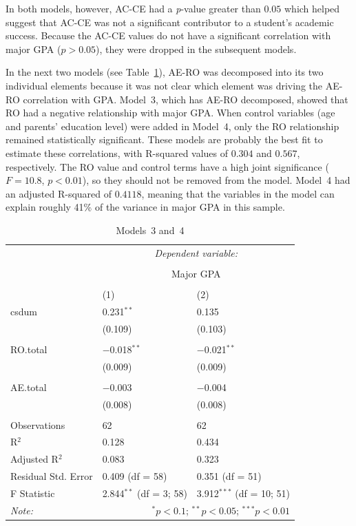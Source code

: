 In both models, however, AC-CE had a \textit{p}-value greater than $0.05$ which helped suggest that AC-CE was not a significant contributor to a student's academic success. Because the AC-CE values do not have a significant correlation with major GPA ($p>0.05$), they were dropped in the subsequent models.

In the next two models (see Table~\ref{tab:models34}), AE-RO was decomposed into its two individual elements because it was not clear which element was driving the AE-RO correlation with GPA. Model~3, which has AE-RO decomposed, showed that RO had a negative relationship with major GPA. When control variables (age and parents' education level) were added in Model~4, only the RO relationship remained statistically significant. These models are probably the best fit to estimate these correlations, with R-squared values of $0.304$ and $0.567$, respectively. The RO value and control terms have a high joint significance ($F=10.8$, $p<0.01$), so they should not be removed from the model. Model~4 had an adjusted R-squared of $0.4118$, meaning that the variables in the model can explain roughly 41\% of the variance in major GPA in this sample.

\begin{table}[!htbp] \centering
  \caption{Models~3 and~4}
  \label{tab:models34}
  \begin{tabular}{@{\extracolsep{5pt}}lll}
    \toprule
     & \multicolumn{2}{c}{\textit{Dependent variable:}} \\
    \cline{2-3}
    \\[-1.8ex] & \multicolumn{2}{c}{Major GPA} \\
    \\[-1.8ex] & (1) & (2)\\
    \midrule
    csdum & 0.231$^{**}$ & 0.135 \\
      & (0.109) & (0.103) \\
      & & \\
    RO.total & $-$0.018$^{**}$ & $-$0.021$^{**}$ \\
      & (0.009) & (0.009) \\
      & & \\
    AE.total & $-$0.003 & $-$0.004 \\
      & (0.008) & (0.008) \\
      & & \\
    \midrule
    Observations & 62 & 62 \\
    R$^{2}$ & 0.128 & 0.434 \\
    Adjusted R$^{2}$ & 0.083 & 0.323 \\
    Residual Std. Error & 0.409 (df = 58) & 0.351 (df = 51) \\
    F Statistic & 2.844$^{**}$ (df = 3; 58) & 3.912$^{***}$ (df = 10; 51) \\
    \bottomrule
    \textit{Note:}  & \multicolumn{2}{r}{$^{*}p<0.1$; $^{**}p<0.05$; $^{***}p<0.01$} \\
  \end{tabular}
\end{table}

